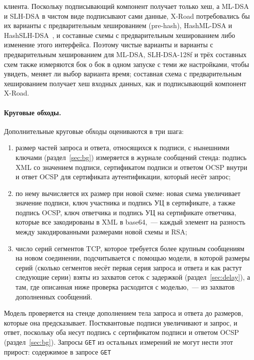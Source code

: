 \documentclass[conference,a4paper]{IEEEtran}
\newcommand{\newtext}[1]{{\color{blue}#1}}
\newcommand{\newgreen}[1]{{\color{green!50!black}#1}}
\newcommand{\newviolet}[1]{{\color{violet}#1}}
\begin{document}
{{клиента.} \newviolet{Поскольку подписывающий компонент получает только хеш, а ML-DSA и SLH-DSA в чистом
виде подписывают сами данные, X-Road потребовались бы их варианты с предварительным хешированием (pre-hash), HashML-DSA и
HashSLH-DSA~\cite{fips204,fips205}, и составные схемы с предварительным хешированием либо изменение этого интерфейса. Поэтому
чистые варианты и варианты с предварительным хешированием для ML-DSA, SLH-DSA-128f и трёх составных схем также
измеряются бок о бок в одном запуске с теми же настройками, чтобы увидеть, меняет ли выбор
варианта время; составная схема с предварительным хешированием получает хеш входных данных, как и подписывающий компонент
X-Road.}

\paragraph{Круговые обходы.} Дополнительные круговые обходы оцениваются в три шага:
\begin{enumerate}
  \item размер частей запроса и ответа, относящихся к подписи, с нынешними ключами
  (раздел~\ref{sec:bg}) измеряется в журнале сообщений стенда: подпись XML со
  значением подписи, сертификатом подписи и ответом OCSP внутри и ответ OCSP для
  сертификата аутентификации, который несёт запрос;
  \item по нему вычисляется их размер при новой схеме: новая схема увеличивает значение подписи,
  ключ участника и подпись УЦ в сертификате, а также подпись OCSP, ключ ответчика и
  подпись УЦ на сертификате ответчика, которые все закодированы в XML в base64,~--- каждый элемент на разность
  между закодированными размерами новой схемы и RSA;
  \item число серий сегментов TCP, которое требуется более крупным сообщениям на новом соединении, подсчитывается с помощью
  модели, в которой размеры серий (сколько сегментов несёт первая серия запроса и ответа
  и как растут следующие серии) взяты из захватов сеток с задержкой
  (раздел~\ref{sec:delay})\newgreen{, а там, где описанная ниже проверка расходится с моделью,~--- из
  захватов дополненных сообщений}.
\end{enumerate}
Модель проверяется на стенде дополнением тела запроса и ответа до размеров, которые она
предсказывает\newtext{. Постквантовые подписи увеличивают и запрос, и ответ, поскольку оба
несут подпись с сертификатом подписи и ответом OCSP (раздел~\ref{sec:bg}). Запросы
\texttt{GET} из остальных измерений не могут нести этот прирост: содержимое в запросе \texttt{GET}
}}
\end{document}
